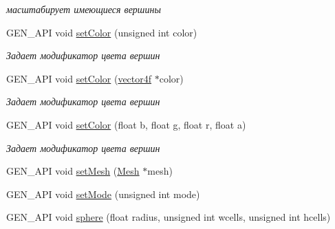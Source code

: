 \begin{DoxyCompactItemize}
\begin{DoxyCompactList}\small\item\em масштабирует имеющиеся вершины \end{DoxyCompactList}\item 
\hypertarget{classgen_1_1_modeller_mesh_ae32222a9066a9ecb78c07cf9b9639bfd}{G\-E\-N\-\_\-\-A\-P\-I void \hyperlink{classgen_1_1_modeller_mesh_ae32222a9066a9ecb78c07cf9b9639bfd}{set\-Color} (unsigned int color)}\label{classgen_1_1_modeller_mesh_ae32222a9066a9ecb78c07cf9b9639bfd}

\begin{DoxyCompactList}\small\item\em Задает модификатор цвета вершин \end{DoxyCompactList}\item 
\hypertarget{classgen_1_1_modeller_mesh_ac7df9d964d1c5bb6058957086ee503f7}{G\-E\-N\-\_\-\-A\-P\-I void \hyperlink{classgen_1_1_modeller_mesh_ac7df9d964d1c5bb6058957086ee503f7}{set\-Color} (\hyperlink{classbt_1_1vector4f}{vector4f} $\ast$color)}\label{classgen_1_1_modeller_mesh_ac7df9d964d1c5bb6058957086ee503f7}

\begin{DoxyCompactList}\small\item\em Задает модификатор цвета вершин \end{DoxyCompactList}\item 
\hypertarget{classgen_1_1_modeller_mesh_a6e45dcb1c341f4c4eef7fc52a8e58a30}{G\-E\-N\-\_\-\-A\-P\-I void \hyperlink{classgen_1_1_modeller_mesh_a6e45dcb1c341f4c4eef7fc52a8e58a30}{set\-Color} (float b, float g, float r, float a)}\label{classgen_1_1_modeller_mesh_a6e45dcb1c341f4c4eef7fc52a8e58a30}

\begin{DoxyCompactList}\small\item\em Задает модификатор цвета вершин \end{DoxyCompactList}\item 
G\-E\-N\-\_\-\-A\-P\-I void \hyperlink{classgen_1_1_modeller_mesh_a5b960ddde71d17dd8b8b60666cf7ab13}{set\-Mesh} (\hyperlink{classcsad_1_1_mesh}{Mesh} $\ast$mesh)
\item 
G\-E\-N\-\_\-\-A\-P\-I void \hyperlink{classgen_1_1_modeller_mesh_ac333825cc70c6c8f218e218864321f3b}{set\-Mode} (unsigned int mode)
\item 
\hypertarget{classgen_1_1_modeller_mesh_a53a5c8fa04ad6ff83e97f80b1cc0d098}{G\-E\-N\-\_\-\-A\-P\-I void \hyperlink{classgen_1_1_modeller_mesh_a53a5c8fa04ad6ff83e97f80b1cc0d098}{sphere} (float radius, unsigned int wcells, unsigned int hcells)}\label{classgen_1_1_modeller_mesh_a53a5c8fa04ad6ff83e97f80b1cc0d098}


\end{DoxyCompactItemize}

